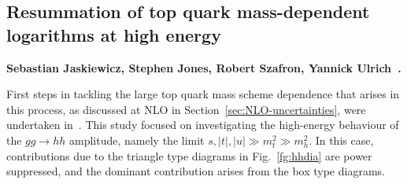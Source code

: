 \subsection{Resummation of top quark mass-dependent logarithms at high energy}
\label{sec:scet}


\textbf{Sebastian Jaskiewicz, Stephen Jones, Robert Szafron, Yannick Ulrich~\cite{Jaskiewicz:2024xkd}.}


\noindent First steps in tackling the large top quark
mass scheme dependence that arises in this process,
as discussed at NLO in Section~\ref{sec:NLO-uncertainties}, were undertaken in~\cite{Jaskiewicz:2024xkd}. 
This study focused on investigating the 
high-energy behaviour of the $gg\to hh$ amplitude, namely the limit $s, |t|, |u| \gg m_t^2 \gg m_h^2$.
In this case, contributions due to the triangle
type diagrams in Fig.~\ref{fg:hhdia}
are power suppressed, and the dominant 
contribution arises from the box type diagrams.

